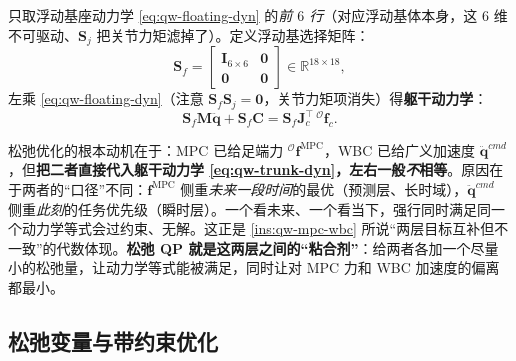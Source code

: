 只取浮动基座动力学 \cref{eq:qw-floating-dyn} 的\emph{前 $6$ 行}（对应浮动基体本身，这 $6$ 维不可驱动、$\boldsymbol{S}_j$ 把关节力矩滤掉了）。定义浮动基选择矩阵\cite{yu2021quadruped}：
\begin{equation}
  \boldsymbol{S}_f=\begin{bmatrix}\mathbf{I}_{6\times6}&\mathbf{0}\\\mathbf{0}&\mathbf{0}\end{bmatrix}\in\mathbb{R}^{18\times18},
  \label{eq:qw-Sf}
\end{equation}
左乘 \cref{eq:qw-floating-dyn}（注意 $\boldsymbol{S}_f\boldsymbol{S}_j=\mathbf{0}$，关节力矩项消失）得\textbf{躯干动力学}\cite{yu2021quadruped}：
\begin{equation}
  \boldsymbol{S}_f\boldsymbol{M}\ddot{\boldsymbol{q}}+\boldsymbol{S}_f\boldsymbol{C}=\boldsymbol{S}_f\boldsymbol{J}_c^\top\,{}^{\mathcal{O}}\boldsymbol{f}_c.
  \label{eq:qw-trunk-dyn}
\end{equation}

\begin{insight}\label{ins:qw-inconsistency}
松弛优化的根本动机在于：MPC 已给足端力 ${}^{\mathcal{O}}\boldsymbol{f}^{\mathrm{MPC}}$，WBC 已给广义加速度 $\ddot{\boldsymbol{q}}^{cmd}$，但\textbf{把二者直接代入躯干动力学 \cref{eq:qw-trunk-dyn}，左右一般\emph{不}相等}。原因在于两者的“口径”不同：$\boldsymbol{f}^{\mathrm{MPC}}$ 侧重\emph{未来一段时间}的最优（预测层、长时域），$\ddot{\boldsymbol{q}}^{cmd}$ 侧重\emph{此刻}的任务优先级（瞬时层）。一个看未来、一个看当下，强行同时满足同一个动力学等式会过约束、无解。这正是 \cref{ins:qw-mpc-wbc} 所说“两层目标互补但不一致”的代数体现。\textbf{松弛 QP 就是这两层之间的“粘合剂”}：给两者各加一个尽量小的松弛量，让动力学等式能被满足，同时让对 MPC 力和 WBC 加速度的偏离都最小。
\end{insight}

\subsection{松弛变量与带约束优化}
\label{subsec:qw-slack}


